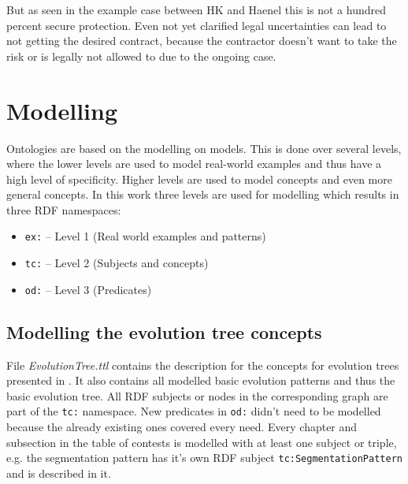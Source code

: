 \documentclass[11pt,a4paper]{article}
\begin{document}
But as seen in the example case between HK and Haenel this is not a hundred percent secure protection. Even not yet clarified legal uncertainties can lead to not getting the desired contract, because the contractor doesn't want to take the risk or is legally not allowed to due to the ongoing case.

\section{Modelling}

Ontologies are based on the modelling on models. This is done over several levels, where the lower levels are used to model real-world examples and thus have a high level of specificity. Higher levels are used to model concepts and even more general concepts. In this work three levels are used for modelling which results in three RDF namespaces:

\begin{itemize}[noitemsep]
\item \texttt{ex:} -- Level 1 (Real world examples and patterns)
\item \texttt{tc:} -- Level 2 (Subjects and concepts)
\item \texttt{od:} -- Level 3 (Predicates) 
\end{itemize}

\subsection{Modelling the evolution tree concepts}

File \textit{EvolutionTree.ttl} contains the description for the concepts for evolution trees presented in \cite{Shpakovsky2016}. It also contains all modelled basic evolution patterns and thus the basic evolution tree.
All RDF subjects or nodes in the corresponding graph are part of the \texttt{tc:} namespace. New predicates in \texttt{od:} didn't need to be modelled because the already existing ones covered every need. Every chapter and subsection in the table of contests is modelled with at least one subject or triple, e.g. the segmentation pattern has it's own RDF subject \texttt{tc:SegmentationPattern} and is described in it. 
\end{document}
